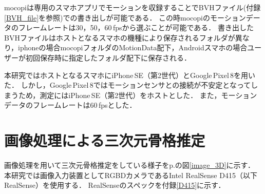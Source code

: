 \documentclass[a4j, fleqn, 12pt]{jsreport}
\begin{document}
mocopiは専用のスマホアプリでモーションを収録することでBVHファイル(付録\ref{BVH_file}を参照)での書き出しが可能である．
この時mocopiのモーションデータのフレームレートは30，50，60\,fpsから選ぶことが可能である．
書き出したBVHファイルはホストとなるスマホの機種により保存されるフォルダが異なり，iphoneの場合mocopiフォルダのMotionData配下，Androidスマホの場合ユーザーが初回保存時に指定したフォルダ配下に保存される．

本研究ではホストとなるスマホにiPhone\,SE（第2世代）とGoogle\,Pixel\,8を用いた．
しかし，Google\,Pixel\,8ではモーションセンサとの接続が不安定となってしまうため，測定にはiPhone\,SE（第2世代）をホストとした．
また，モーションデータのフレームレートは60\,fpsとした．

\section{画像処理による三次元骨格推定}\label{3Dskeleton}
画像処理を用いて三次元骨格推定をしている様子をp.\pageref{image_3D}の図\ref{image_3D}に示す．
本研究では画像入力装置としてRGBDカメラであるIntel RealSense D415（以下RealSense）を使用する．
RealSenseのスペックを付録\ref{D415}に示す．
\end{document}
